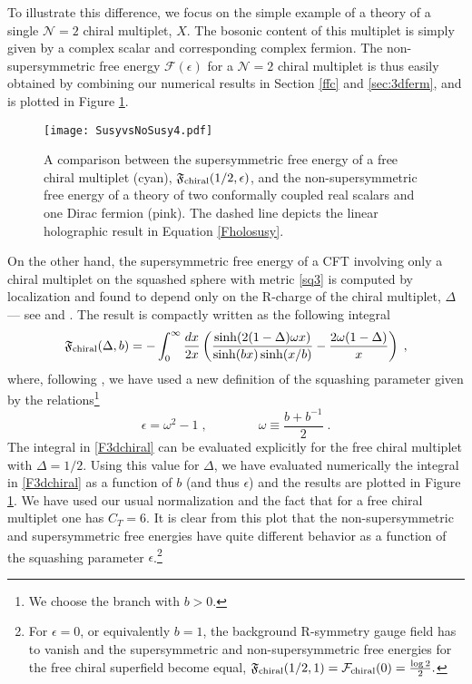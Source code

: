 \documentclass[12pt]{article}
\numberwithin{equation}{section}
\newcommand{\ssc}{\scriptscriptstyle}
\newcommand{\ctt}{C_{\ssc T}}
\begin{document}
To illustrate this difference, we focus on the simple example of a theory of a single $\mathcal{N}=2$ chiral multiplet, $X$. The bosonic content of this multiplet is simply given by a complex scalar and corresponding complex fermion. The non-supersymmetric free energy $\mathcal{F}(\epsilon)$ for a  $\mathcal{N}=2$ chiral multiplet is thus easily obtained by combining our numerical results in Section \ref{ffc} and \ref{sec:3dferm}, and is plotted in Figure \ref{fig:F3susy}. 



\begin{figure}[ht!]
	\centering
	\texttt{[image: SusyvsNoSusy4.pdf]}
	\caption{A comparison between the supersymmetric free energy of a free chiral multiplet (cyan), $\mathfrak{F}_{\rm chiral}(1/2,\epsilon) $, and the non-supersymmetric free energy of a theory of two conformally coupled real scalars and one Dirac fermion (pink). The dashed line depicts the linear holographic result in Equation \eqref{Fholosusy}.
	}\label{fig:F3susy}
\end{figure}


On the other hand, the supersymmetric free energy of a CFT involving only a chiral multiplet on the squashed sphere with metric \eqref{sq3} is computed by localization and found to depend only on the R-charge of the chiral multiplet, $\Delta$ --- see \cite{Imamura:2011wg} and \cite{Closset:2012ru,Nishioka:2013gza}. The result is compactly written as the following integral
%
\begin{equation}\label{F3dchiral}
\mathfrak{F}_{\rm chiral}(\Delta,b) = - \int_{0}^{\infty} \frac{dx}{2x} \left( \frac{\sinh(2(1-\Delta)\omega x)}{\sinh(bx)\sinh(x/b)} - \frac{2\omega(1-\Delta)}{x}\right)\;,
\end{equation}
%
where, following \cite{Nishioka:2013gza}, we have used a new definition of the squashing parameter given by the relations\footnote{We choose the branch with $b>0$.} 
%
\begin{equation}\label{epsbmap}
\epsilon = \omega^2-1\;, \qquad\qquad \omega \equiv \frac{b+b^{-1}}{2}\;.
\end{equation}
%
The integral in \eqref{F3dchiral} can be evaluated explicitly for the free chiral multiplet with $\Delta=1/2$. Using this value for $\Delta$, we have evaluated numerically the integral in \eqref{F3dchiral} as a function of $b$ (and thus $\epsilon$) and the results are plotted in Figure \ref{fig:F3susy}. We have used our usual normalization and the fact that for a free chiral multiplet one has  $\ctt=6$.  It is clear from this plot that the non-supersymmetric and supersymmetric free energies have quite different behavior as a function of the squashing parameter $\epsilon$.\footnote{For $\epsilon=0$, or equivalently $b=1$, the background R-symmetry gauge field has to vanish and the supersymmetric and non-supersymmetric free energies for the free chiral superfield become equal, $\mathfrak{F}_{\rm chiral}(1/2,1) = \mathcal{F}_{\rm chiral}(0)=\frac{\log{2}}{2}.$}
\end{document}
